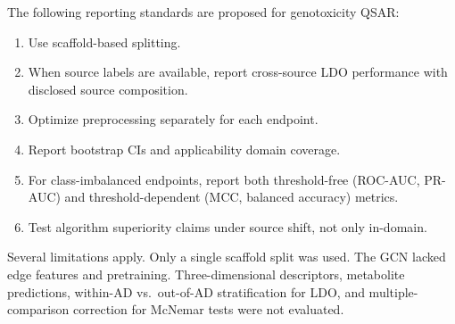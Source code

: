 The following reporting standards are proposed for genotoxicity QSAR:

\begin{enumerate}
    \item Use scaffold-based splitting.
    \item When source labels are available, report cross-source LDO performance with 
    disclosed source composition.
    \item Optimize preprocessing separately for each endpoint.
    \item Report bootstrap CIs and applicability domain coverage.
    \item For class-imbalanced endpoints, report both threshold-free (ROC-AUC, PR-AUC) and 
    threshold-dependent (MCC, balanced accuracy) metrics.
    \item Test algorithm superiority claims under source shift, not only in-domain.
\end{enumerate}

Several limitations apply. Only a single scaffold split was used. The GCN lacked edge 
features and pretraining.\cite{Hu_2020_pretrain} Three-dimensional descriptors, metabolite 
predictions, within-AD vs.\ out-of-AD stratification for LDO, and multiple-comparison 
correction for McNemar tests\cite{Demsar_2006} were not evaluated.


